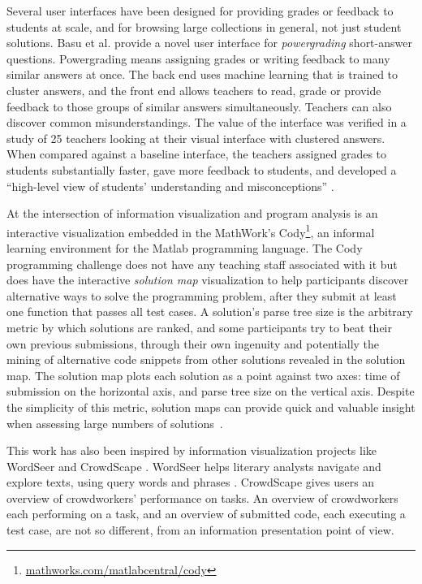 \documentclass{sigchi}
\begin{document}
Several user interfaces have been designed for providing grades or feedback to students at scale, and for browsing large collections in general, not just student solutions. Basu et al. \citeyear{basupowergrading} provide a novel user interface for {\it powergrading} short-answer questions. Powergrading means assigning grades or writing feedback to many similar answers at once. The back end uses machine learning that is trained to cluster answers, and the front end allows teachers to read, grade or provide feedback to those groups of similar answers simultaneously. Teachers can also discover common misunderstandings. The value of the interface was verified in a study of 25 teachers looking at their visual interface with clustered answers. When compared against a baseline interface, the teachers assigned grades to students substantially faster, gave more feedback to students, and developed a ``high-level view of students' understanding and misconceptions'' \cite{basuDivideAndConquer}.

At the intersection of information visualization and program analysis is an interactive visualization embedded in the MathWork’s Cody\footnote{\url{mathworks.com/matlabcentral/cody}}, an informal learning environment for the Matlab programming language. The Cody programming challenge does not have any teaching staff associated with it but does have the interactive {\em solution map} visualization to help participants discover alternative ways to solve the programming problem, after they submit at least one function that passes all test cases. A solution’s parse tree size is the arbitrary metric by which solutions are ranked, and some participants try to beat their own previous submissions, through their own ingenuity and potentially the mining of alternative code snippets from other solutions revealed in the solution map. The solution map plots each solution as a point against two axes: time of submission on the horizontal axis, and parse tree size on the vertical axis. Despite the simplicity of this metric, solution maps can provide quick and valuable insight when assessing large numbers of solutions~\cite{ICERGlassman}.

This work has also been inspired by information visualization projects like WordSeer \cite{wordseerlitcomp13,wordseercikm13} and CrowdScape \cite{crowdscape}. WordSeer helps literary analysts navigate and explore texts, using query words and phrases \cite{wordseerhcir11}. CrowdScape gives users an overview of crowdworkers' performance on tasks. An overview of crowdworkers each performing on a task, and an overview of submitted code, each executing a test case, are not so different, from an information presentation point of view.
\end{document}
